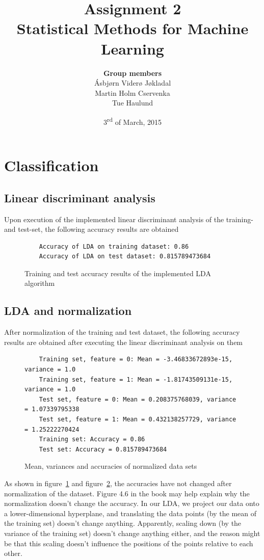 \documentclass[a4paper]{article}
\title{\textbf{Assignment 2} \\ \small Statistical Methods for Machine Learning }
\author{\textbf{Group members}\\
        Ásbjørn Viderø Jøkladal\\
        Martin Holm Cservenka\\
        Tue Haulund}
\date{3\textsuperscript{rd} of March, 2015}
\begin{document}
\maketitle
\tableofcontents
\newpage

\section{Classification}

\subsection{Linear discriminant analysis}
Upon execution of the implemented linear discriminant analysis of the training- and test-set, the following accuracy results are obtained
\begin{figure}[H]
	\begin{lstlisting}
	Accuracy of LDA on training dataset: 0.86
	Accuracy of LDA on test dataset: 0.815789473684
	\end{lstlisting}
	\caption{Training and test accuracy results of the implemented LDA algorithm}
	\label{fig:lda_results}
\end{figure}

\subsection{LDA and normalization}
After normalization of the training and test dataset, the following accuracy results are obtained after executing the linear discriminant analysis on them
\begin{figure}[H]
	\begin{lstlisting}
	Training set, feature = 0: Mean = -3.46833672893e-15, variance = 1.0
	Training set, feature = 1: Mean = -1.81743509131e-15, variance = 1.0
	Test set, feature = 0: Mean = 0.208375768039, variance = 1.07339795338
	Test set, feature = 1: Mean = 0.432138257729, variance = 1.25222270424
	Training set: Accuracy = 0.86
	Test set: Accuracy = 0.815789473684
	\end{lstlisting}
	\caption{Mean, variances and accuracies of normalized data sets}
	\label{fig:lda_norm_results}
\end{figure}

As shown in figure~\ref{fig:lda_results} and figure~\ref{fig:lda_norm_results}, the accuracies have not changed after normalization of the dataset. Figure 4.6 in the book may help explain why the normalization doesn't change the accuracy. In our LDA, we project our data onto a lower-dimensional hyperplane, and translating the data points (by the mean of the training set) doesn't change anything. Apparently, scaling down (by the variance of the training set) doesn't change anything either, and the reason might be that this scaling doesn't influence the positions of the points relative to each other.
\end{document}
